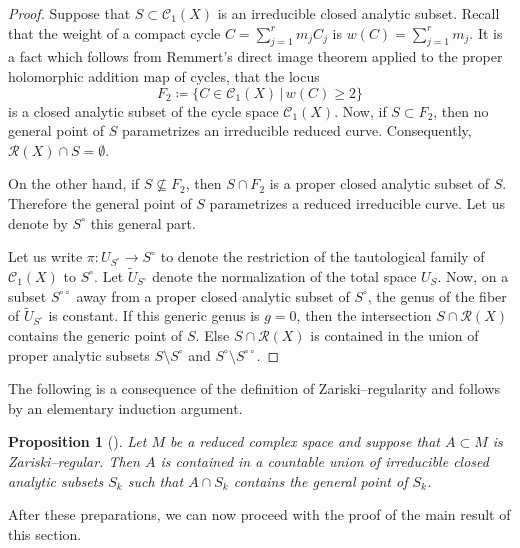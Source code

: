 \documentclass[11pt,a4paper]{article}
\newtheorem{prop}[theorem]{Proposition}
\theoremstyle{definition}
\newcommand{\cC}{\mathcal{C}}
\newcommand{\cR}{\mathcal{R}}
\begin{document}
\begin{proof}
  Suppose that $S \subset \cC_1(X)$ is an irreducible closed analytic subset. Recall that the weight of a compact cycle $C = \sum_{j=1}^r m_j C_j$ is $w(C) = \sum_{j=1}^r m_j$. It is a fact \cite[Proposition 4.7.2]{BarletMagnusson2019CyclesI} which follows from Remmert's direct image theorem applied to the proper holomorphic addition map of cycles, that the locus
  \begin{equation*}
      F_2 \coloneq \{ C \in \cC_1(X) \, | \, w(C)\geq 2\} 
  \end{equation*}
  is a closed analytic subset of the cycle space $\cC_1(X)$. Now, if $S \subset F_2$, then no general point of $S$ parametrizes an irreducible reduced curve. Consequently, $\cR(X) \cap S = \emptyset$. 

  On the other hand, if $S \nsubseteq F_2$, then $S \cap F_2$ is a proper closed analytic subset of $S$. Therefore the general point of $S$ parametrizes a reduced irreducible curve. Let us denote by $S^\circ$ this general part.

  Let us write $\pi: U_{S^\circ} \to S^\circ$ to denote the restriction of the tautological family of $\cC_1(X)$ to $S^\circ$. Let $\tilde{U}_{S^\circ}$ denote the normalization of the total space $U_S$. Now, on a subset $S^{\circ \circ}$ away from a proper closed analytic subset of $S^\circ$, the genus of the fiber of $\tilde{U}_{S^\circ}$ is constant. If this generic genus is $g=0$, then the intersection $S \cap \cR(X)$ contains the generic point of $S$. Else $S \cap \cR(X)$ is contained in the union of proper analytic subsets $S \setminus S^\circ$ and $S^\circ \setminus S^{\circ \circ}$. 
\end{proof}

The following is a consequence of the definition of Zariski--regularity and follows by an elementary induction argument. 

\begin{prop}[{\cite[Proposition 2.4]{Campana2004Appendix}}]\label{better covers}
  Let $M$ be a reduced complex space and suppose that $A \subset M$ is Zariski--regular. Then $A$ is contained in a countable union of irreducible closed analytic subsets $S_k$ such that $A \cap S_k$ contains the general point of $S_k$.
\end{prop}

After these preparations, we can now proceed with the proof of the main result of this section.
\end{document}
